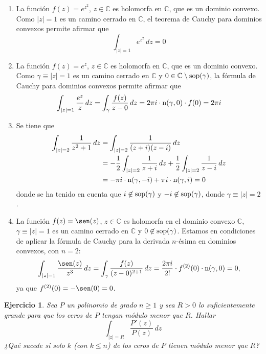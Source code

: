 \documentclass[11pt]{report}
\makeatletter
\renewenvironment{proof}[1][\proofname]{\par
  \pushQED{\qed}%
  \normalfont \topsep\z@skip %
  \trivlist
  \item[\hskip\labelsep
        \itshape
    #1\@addpunct{.}]\ignorespaces
}{%
  \popQED\endtrivlist\@endpefalse
}
\newcommand{\C}{\mathbb C}
\newtheorem{exercise}{Ejercicio}
\makeatother
\begin{document}
\begin{proof}
\hfill
\begin{enumerate}
    \item La función $f(z)=e^{z^2}$, $z \in \C$ es holomorfa en $\C$, que es un dominio convexo. Como $|z|=1$ es un camino cerrado en $\C$, el teorema de Cauchy para dominios convexos permite afirmar que
    \[\int_{|z|=1} e^{z^2} \, dz = 0\]
    \item La función $f(z)=e^{z}$, $z \in \C$ es holomorfa en $\C$, que es un dominio convexo. Como $\gamma \equiv |z|=1$ es un camino cerrado en $\C$ y $0 \in \C \setminus \textup{sop}(\gamma)$, la fórmula de Cauchy para dominios convexos permite afirmar que
    \[\int_{|z|=1} \frac{e^z}{z} \, dz = \int_{\gamma} \frac{f(z)}{z-0} \, dz = 2\pi i \cdot \textup{n}(\gamma,0) \cdot f(0) = 2\pi i\]
    \item Se tiene que
    \[
    \begin{aligned}[t]
    \int_{|z| = 2} \frac{1}{z^2+1} \, dz &= \int_{|z| = 2} \frac{1}{(z+i)(z-i)} \, dz \\ &= -\frac{1}{2}\int_{|z| = 2} \frac{1}{z+i}\, dz + \frac{1}{2} \int_{|z| = 2} \frac{1}{z-i}\, dz\\ &= -\pi i \cdot \textup{n}(\gamma,-i)+\pi i \cdot \textup{n}(\gamma,i) = 0        
    \end{aligned}\]
    donde se ha tenido en cuenta que $i \not\in \textup{sop}(\gamma)$ y $-i\not\in \textup{sop}(\gamma)$, donde $\gamma \equiv |z| = 2$.
    \item La función $f(z) = \sen(z)$, $z \in \C$ es holomorfa en el dominio convexo $\C$, $\gamma \equiv |z| = 1$ es un camino cerrado en $\C$ y $0 \not\in \textup{sop}(\gamma)$. Estamos en condiciones de aplicar la fórmula de Cauchy para la derivada $n$-ésima en dominios convexos, con $n = 2$:
    \[\int_{|z| = 1}\frac{\sen(z)}{z^3} \, dz = \int_{\gamma} \frac{f(z)}{(z-0)^{2+1}} \, dz =\frac{2\pi i}{2!} \cdot f^{(2)}(0) \cdot \textup{n}(\gamma,0) = 0,\]
    ya que $f^{(2)}(0) = -\sen(0)=0$. \qedhere
\end{enumerate}
\end{proof}

\begin{exercise}
Sea $P$ un polinomio de grado $n \geq 1$ y sea $R>0$ lo suficientemente grande para que los ceros de $P$ tengan módulo menor que $R$. Hallar
\[\int_{|z| = R} \frac{P'(z)}{P(z)} \, dz\]
¿Qué sucede si solo $k$ (con $k \leq n$) de los ceros de $P$ tienen módulo menor que $R$?
\end{exercise}
\end{document}
